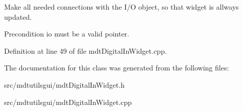 Make all needed connections with the I/O object, so that widget is allways updated.

\begin{DoxyPrecond}{Precondition}
io must be a valid pointer. 
\end{DoxyPrecond}


Definition at line 49 of file mdtDigitalInWidget.cpp.



The documentation for this class was generated from the following files:\begin{DoxyCompactItemize}
\item 
src/mdtutilsgui/mdtDigitalInWidget.h\item 
src/mdtutilsgui/mdtDigitalInWidget.cpp\end{DoxyCompactItemize}
